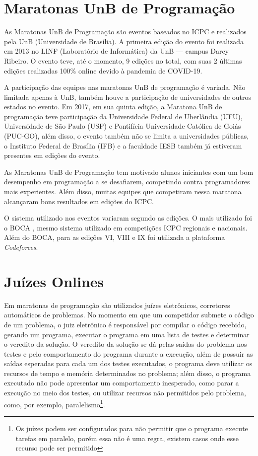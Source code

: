 \section{Maratonas UnB de Programação}
\label{sec:maratonasUnB}

As Maratonas UnB de Programação são eventos baseados no ICPC e realizados pela UnB (Universidade de Brasília). A primeira edição do evento foi realizada em 2013 no LINF (Laboratório de Informática) da UnB — campus Darcy Ribeiro. O evento teve, até o momento, 9 edições no total, com suas 2 últimas edições realizadas 100\% online devido à pandemia de COVID-19.

A participação das equipes nas maratonas UnB de programação é variada. Não limitada apenas à UnB, também houve a participação de universidades de outros estados no evento. Em 2017, em sua quinta edição, a Maratona UnB de programação teve participação da Universidade Federal de Uberlândia (UFU), Universidade de São Paulo (USP) e Pontifícia Universidade Católica de Goiás (PUC-GO), além disso, o evento também não se limita a universidades públicas, o Instituto Federal de Brasília (IFB) e a faculdade IESB também já estiveram presentes em edições do evento.

As Maratonas UnB de Programação tem motivado alunos iniciantes com um bom desempenho em programação a se desafiarem, competindo contra programadores mais experientes. Além disso, muitas equipes que competiram nessa maratona alcançaram bons resultados em edições do ICPC.

O sistema utilizado nos eventos variaram segundo as edições. O mais utilizado foi o BOCA \cite{de2004boca}, mesmo sistema utilizado em competições ICPC regionais e nacionais. Além do BOCA, para as edições VI, VIII e IX foi utilizada a plataforma \textit{Codeforces}.

\section{Juízes Onlines}
\label{sec:juizesOnline}

Em maratonas de programação são utilizados juízes eletrônicos, corretores automáticos de problemas. No momento em que um competidor submete o código de um problema, o juiz eletrônico é responsável por compilar o código recebido, gerando um programa, executar o programa em uma lista de testes e determinar o veredito da solução. O veredito da solução se dá pelas saídas do problema nos testes e pelo comportamento do programa durante a execução, além de possuir as saídas esperadas para cada um dos testes executados, o programa deve utilizar os recursos de tempo e memória determinados no problema; além disso, o programa executado não pode apresentar um comportamento inesperado, como parar a execução no meio dos testes, ou utilizar recursos não permitidos pelo problema, como, por exemplo, paralelismo\footnote{Os juízes podem ser configurados para não permitir que o programa execute tarefas em paralelo, porém essa não é uma regra, existem casos onde esse recurso pode ser permitido}. 

